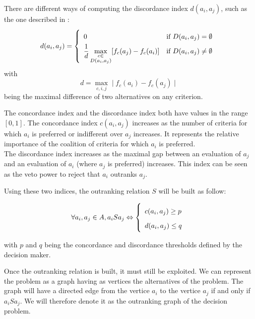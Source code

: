 There are different ways of computing the discordance index $d(a_i,a_j)$, such as the one described in \cite{Roy1968}:
\begin{equation}
    d(a_i,a_j) = \left \{
        \renewcommand{\arraystretch}{1.75}
        \begin{array}{ l l l }
            0 & \text{if } D(a_i,a_j) = \emptyset  \\
            \dfrac{1}{d}  \max\limits_{\substack{c \in \\ D(a_i,a_j)}}[f_c(a_j)-f_c(a_i)] & \text{if } D(a_i,a_j) \neq \emptyset  \\
        \end{array}
        \right . \\
    \label{eq:electre_discordance_index}
\end{equation}
with
\begin{equation}
    d = \max\limits_{c, i, j} \mid f_c(a_i) - f_c(a_j) \mid
    \label{eq:electre_max_ecart}
\end{equation}
being the maximal difference of two alternatives on any criterion.

The concordance index and the discordance index both have values in the range $[0,1]$. The concordance index $c(a_i,a_j)$ increases as the number of criteria for which $a_i$ is preferred or indifferent over $a_j$ increases. It represents the relative importance of the coalition of criteria for which $a_i$ is preferred. \\
The discordance index increases as the maximal gap between an evaluation of $a_j$ and an evaluation of $a_i$ (where $a_j$ is preferred) increases. This index can be seen as the veto power to reject that $a_i$ outranks $a_j$.


Using these two indices, the outranking relation $S$ will be built as follow:

\begin{equation}
    \forall a_i, a_j \in A, a_iSa_j \Leftrightarrow \left \{
        \begin{array}[]{l}
            c(a_i,a_j) \ge p \\
            d(a_i,a_j) \le q \\
        \end{array}
        \right .
    \label{eq:electre_dominance_relation}
\end{equation}

with $p$ and $q$ being the concordance and discordance thresholds defined by the decision maker.

Once the outranking relation is built, it must still be exploited. We can represent the problem as a graph having as vertices the alternatives of the problem. The graph will have a directed edge from the vertice $a_i$ to the vertice $a_j$ if and only if $a_iSa_j$. We will therefore denote it as the outranking graph of the decision problem.

